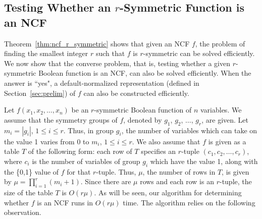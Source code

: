 \subsection{Testing Whether an $r$-Symmetric Function is an NCF}
\label{sse:rsym_to_ncf}

Theorem~\ref{thm:ncf_r_symmetric} shows that given an NCF $f$,
the problem of finding the smallest integer $r$ such that
$f$ is $r$-symmetric can be solved efficiently.
We now show that the converse problem, that is, testing whether a given
$r$-symmetric Boolean function is an NCF,
can also be solved efficiently.
When the answer is ``yes", a
default-normalized representation (defined in Section~\ref{sec:prelim})
of $f$ can also be constructed efficiently.

Let $f(x_1, x_2, \ldots, x_n)$ be an $r$-symmetric 
Boolean function of $n$ variables.
We assume that the symmetry groups 
of $f$, denoted by $g_1$, $g_2$, $\ldots$, $g_r$,
are given.
Let $m_i = |g_i|$, $1 \leq i \leq r$.
Thus, in group $g_i$, the number
of variables which can take on the value 1 varies from 0
to $m_i$, $1 \leq i \leq r$.
We also assume that $f$ is
given as a table $T$ of the following form:
each row of $T$ specifies an $r$-tuple $(c_1, c_2, \ldots, c_r)$,
where $c_i$ is the number of variables of group $g_i$ which
have the value 1, along with the \{0,1\} value of $f$ for that $r$-tuple.
Thus, $\mu$, the number of rows in $T$, 
is given by  $\mu = \prod_{i=1}^r (m_i+1)$.
Since there are $\mu$ rows and each row is an $r$-tuple,
the size of the table $T$ is $O(r\mu)$.
As will be seen, our algorithm for determining whether $f$ is
an NCF runs in $O(r\mu)$ time.
The algorithm relies on the following observation.

